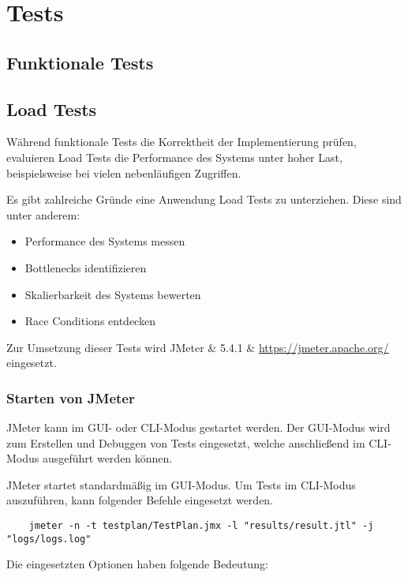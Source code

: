 \chapter{Tests}

\section{Funktionale Tests}
\label{sec:tests-functional}


\section{Load Tests}
\label{sec:tests-load}
Während funktionale Tests die Korrektheit der Implementierung prüfen,
evaluieren Load Tests die Performance des Systems unter hoher Last,
beispielsweise bei vielen nebenläufigen Zugriffen.

Es gibt zahlreiche Gründe eine Anwendung Load Tests zu unterziehen.
Diese sind unter anderem:

\begin{itemize}
    \item Performance des Systems messen
    \item Bottlenecks identifizieren
    \item Skalierbarkeit des Systems bewerten
    \item Race Conditions entdecken
\end{itemize}

Zur Umsetzung dieser Tests wird JMeter \& 5.4.1 \& \url{https://jmeter.apache.org/} eingesetzt.

\subsection{Starten von JMeter}

JMeter kann im GUI- oder CLI-Modus gestartet werden.
Der GUI-Modus wird zum Erstellen und Debuggen von Tests eingesetzt,
welche anschließend im CLI-Modus ausgeführt werden können.

JMeter startet standardmäßig im GUI-Modus.
Um Tests im CLI-Modus auszuführen, kann folgender Befehle eingesetzt werden.

\begin{lstlisting}
    jmeter -n -t testplan/TestPlan.jmx -l "results/result.jtl" -j "logs/logs.log"
\end{lstlisting}

Die eingesetzten Optionen haben folgende Bedeutung:

